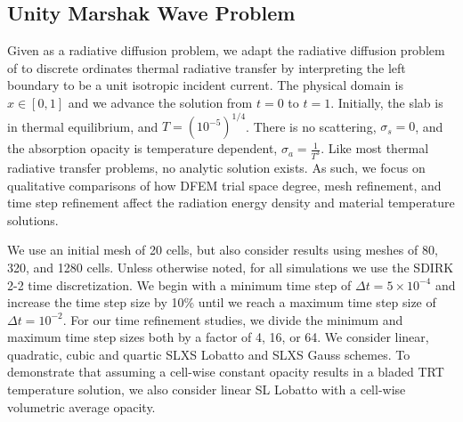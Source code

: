 \subsection{Unity Marshak Wave Problem}

Given as a radiative diffusion problem, we adapt the radiative diffusion problem of \cite{ober_shadid} to discrete ordinates thermal radiative transfer by interpreting the left boundary to be a unit isotropic incident current.
The physical domain is $x\in[0,1]$ and we advance the solution from $t=0$ to $t=1$.
Initially, the slab is in thermal equilibrium, and $T=\left( 10^{-5} \right)^{1/4}$.
There is no scattering, $\sigma_s = 0$, and the absorption opacity is temperature dependent, $\sigma_a = \frac{1}{T^3}$.
Like most thermal radiative transfer problems, no analytic solution exists.  
As such, we focus on qualitative comparisons of how DFEM trial space degree, mesh refinement, and time step refinement affect the radiation energy density and material temperature solutions.

We use an initial mesh of 20 cells, but also consider results using meshes of 80, 320, and 1280 cells.
Unless otherwise noted, for all simulations we use the SDIRK 2-2 time discretization.
We begin with a minimum time step of $\Delta t = 5\times 10^{-4}$ and increase the time step size by 10\% until we reach a maximum time step size of $\Delta t = 10^{-2}$.
For our time refinement studies, we divide the minimum and maximum time step sizes both by a factor of 4, 16, or 64.
We consider linear, quadratic, cubic and quartic SLXS Lobatto and SLXS Gauss schemes.
To demonstrate that assuming a cell-wise constant opacity results in a bladed  TRT temperature solution, we also consider linear SL Lobatto with a cell-wise volumetric average opacity.

